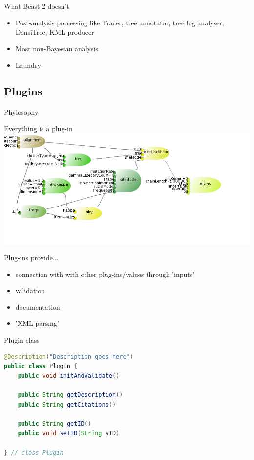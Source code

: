 \documentclass{beamer}
\theoremstyle{definition}
\begin{document}
\begin{frame}{What Beast 2 doesn't}
\begin{itemize}
\item Post-analysis processing like Tracer, tree annotator, tree log analyser, DensiTree, KML producer
\item Most non-Bayesian analysis
\item Laundry
\end{itemize}

\end{frame}


\subsection{Plugins}

\begin{frame}[containsverbatim]
{Phylosophy}

Everything is a plug-in
\vskip0.5cm
\includegraphics[width=\textwidth]{hkymodel.png}

Plug-ins provide...
\begin{itemize}
\item connection with with other plug-ins/values through 'inputs'
\item validation
\item documentation
\item 'XML parsing'
\end{itemize}
\end{frame}

\begin{frame}[containsverbatim]
{Plugin class}

\begin{lstlisting}[language=java]
@Description("Description goes here")
public class Plugin {
    public void initAndValidate()

    public String getDescription()
    public String getCitations()

    public String getID()
    public void setID(String sID)

} // class Plugin
\end{lstlisting}

\end{frame}
\end{document}
